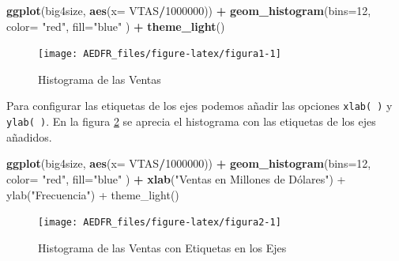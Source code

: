 \documentclass[letterpaper,]{book}
\newenvironment{Shaded}{\begin{snugshade}}{\end{snugshade}}
\newcommand{\DataTypeTok}[1]{\textcolor[rgb]{0.13,0.29,0.53}{#1}}
\newcommand{\DecValTok}[1]{\textcolor[rgb]{0.00,0.00,0.81}{#1}}
\newcommand{\KeywordTok}[1]{\textcolor[rgb]{0.13,0.29,0.53}{\textbf{#1}}}
\newcommand{\NormalTok}[1]{#1}
\newcommand{\OperatorTok}[1]{\textcolor[rgb]{0.81,0.36,0.00}{\textbf{#1}}}
\newcommand{\StringTok}[1]{\textcolor[rgb]{0.31,0.60,0.02}{#1}}
\begin{document}
\begin{Shaded}
\begin{Highlighting}[]
\KeywordTok{ggplot}\NormalTok{(big4size, }\KeywordTok{aes}\NormalTok{(}\DataTypeTok{x=}\NormalTok{ VTAS}\OperatorTok{/}\DecValTok{1000000}\NormalTok{)) }\OperatorTok{+}\StringTok{ }
\StringTok{  }\KeywordTok{geom_histogram}\NormalTok{(}\DataTypeTok{bins=}\DecValTok{12}\NormalTok{, }\DataTypeTok{color=} \StringTok{"red"}\NormalTok{, }\DataTypeTok{fill=}\StringTok{"blue"}\NormalTok{ ) }\OperatorTok{+}\StringTok{ }
\StringTok{  }\KeywordTok{theme_light}\NormalTok{()}
\end{Highlighting}
\end{Shaded}

\begin{figure}[h!]

{\centering \texttt{[image: AEDFR\_files/figure-latex/figura1-1]} 

}

\caption{Histograma de las Ventas}\label{fig:figura1}
\end{figure}

Para configurar las etiquetas de los ejes podemos añadir las opciones \texttt{xlab(\ )} y \texttt{ylab(\ )}. En la figura \ref{fig:figura2} se aprecia el histograma con las etiquetas de los ejes añadidos.

\begin{Shaded}
\begin{Highlighting}[]
\KeywordTok{ggplot}\NormalTok{(big4size, }\KeywordTok{aes}\NormalTok{(}\DataTypeTok{x=}\NormalTok{ VTAS}\OperatorTok{/}\DecValTok{1000000}\NormalTok{)) }\OperatorTok{+}\StringTok{ }
\StringTok{  }\KeywordTok{geom_histogram}\NormalTok{(}\DataTypeTok{bins=}\DecValTok{12}\NormalTok{, }\DataTypeTok{color=} \StringTok{"red"}\NormalTok{,  }\DataTypeTok{fill=}\StringTok{"blue"}\NormalTok{ ) }\OperatorTok{+}\StringTok{ }
\StringTok{  }\KeywordTok{xlab}\NormalTok{(}\StringTok{"Ventas en Millones de Dólares") + ylab("}\NormalTok{Frecuencia}\StringTok{") +}
\StringTok{  theme_light()}
\end{Highlighting}
\end{Shaded}

\begin{figure}[h!]

{\centering \texttt{[image: AEDFR\_files/figure-latex/figura2-1]} 

}

\caption{Histograma de las Ventas con Etiquetas en los Ejes}\label{fig:figura2}
\end{figure}
\end{document}
